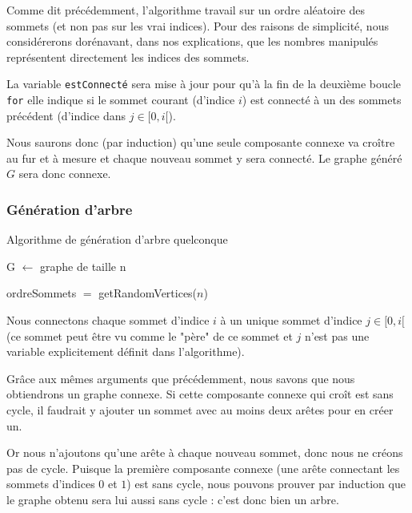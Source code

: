 \documentclass[a4paper,10pt]{article}
\begin{document}
Comme dit précédemment, l'algorithme travail sur un ordre aléatoire des sommets (et non pas sur les vrai indices). Pour des raisons de simplicité, nous considérerons dorénavant, dans nos explications, que les nombres manipulés représentent directement les indices des sommets.

La variable \texttt{estConnecté} sera mise à  jour pour qu'à la fin de la deuxième boucle \texttt{for} elle indique si le sommet courant (d'indice $i$) est connecté à un des sommets précédent (d'indice dans $j\in[0, i[$).

Nous saurons donc (par induction) qu'une seule composante connexe va croître au fur et à mesure et chaque nouveau sommet y sera connecté. Le graphe généré $G$ sera donc connexe.

\subsubsection{Génération d'arbre}

\begin{algorithm}[H]
\caption{Algorithme de génération d'arbre quelconque}
\BlankLine
G $\leftarrow$ graphe de taille n

ordreSommets $=$ getRandomVertices($n$)



\end{algorithm}
\bigskip

Nous connectons chaque sommet d'indice $i$ à un unique sommet d'indice $j\in[0, i[$ (ce sommet peut être vu comme le "père" de ce sommet et $j$ n'est pas une variable explicitement définit dans l'algorithme).

Grâce aux mêmes arguments que précédemment, nous savons que nous obtiendrons un graphe connexe. Si cette composante connexe qui croît est sans cycle, il faudrait y ajouter un sommet avec au moins deux arêtes pour en créer un.

Or nous n'ajoutons qu'une arête à chaque nouveau sommet, donc nous ne créons pas de cycle. Puisque la première composante connexe (une arête connectant les sommets d'indices $0$ et $1$) est sans cycle, nous pouvons prouver par induction que le graphe obtenu sera lui aussi sans cycle : c'est donc bien un arbre.
\end{document}
